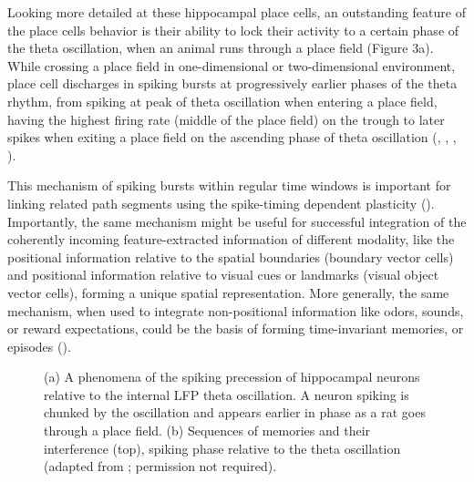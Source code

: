 Looking more detailed at these hippocampal place cells, an outstanding feature of the place cells behavior is their ability to lock their activity to a certain phase of the theta oscillation, when an animal runs through a place field (Figure 3a). While crossing a place field in one-dimensional or two-dimensional environment, place cell discharges in spiking bursts at progressively earlier phases of the theta rhythm, from spiking at peak of theta oscillation when entering a place field, having the highest firing rate (middle of the place field) on the trough to later spikes when exiting a place field on the ascending phase of theta oscillation (\cite{Jensen1996}, \cite{Skaggs1996}, \cite{Tsodyks1996}, \cite{Dragoi2006}).

This mechanism of spiking bursts within regular time windows is important for linking related path segments using the spike-timing dependent plasticity (\cite{Dan2004}). Importantly, the same mechanism might be useful for successful integration of the coherently incoming feature-extracted information of different modality, like the positional information relative to the spatial boundaries (boundary vector cells) and positional information relative to visual cues or landmarks (visual object vector cells), forming a unique spatial representation. More generally, the same mechanism, when used to integrate non-positional information like odors, sounds, or reward expectations, could be the basis of forming time-invariant memories, or episodes (\cite{Buzsaki2018}).


\begin{figure}
\captionsetup{format=plain}
\caption[Phase precession]{
(a) A phenomena of the spiking precession of hippocampal neurons relative to the internal LFP theta oscillation. A neuron spiking is chunked by the oscillation and appears earlier in phase as a rat goes through a place field. (b) Sequences of memories and their interference (top), spiking phase relative to the theta oscillation (adapted from \cite{Geisler2010}; permission not required).
}
\label{fig:F3_phase_precession}
\end{figure}



